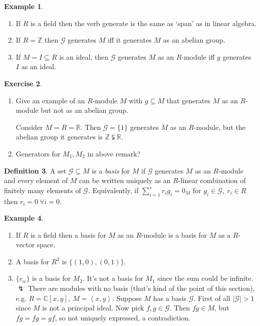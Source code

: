 \documentclass[a4paper]{article}
\newcommand{\la}{\left\langle}
\newcommand{\ra}{\right\rangle}
\newcommand{\Z}{\mathbb Z}
\newcommand{\C}{\mathbb C}
\theoremstyle{definition}
\newtheorem{defn}{Definition}[subsection]
\newtheorem{example}[defn]{Example}
\newtheorem{exe}[defn]{Exercise}
\begin{document}
\begin{example}
\begin{enumerate}
\item If $R$ is a field then the verb generate is the same as `span' as in linear algebra.
\item If $R=\Z$ then $\mathcal G$ generates $M$ iff it generates $M$ as an abelian group.
\item If $M=I\subseteq R$ is an ideal, then $\mathcal G$ generates $M$ as an $R$-module iff $g$ generates $I$ as an ideal.
\end{enumerate}
\end{example}

\begin{exe}
\begin{enumerate}
\item Give an example of an $R$-module $M$ with $g\subseteq M$ that generates $M$ as an $R$-module but not as an abelian group.

Consider $M=R=\mathbb R$. Then $\mathcal G=\{1\}$ generates $M$ as an $R$-module, but the abelian group it generates is $\Z\subsetneqq \mathbb R$.
\item Generators for $M_1,M_2$ in above remark?
\end{enumerate}
\end{exe}

\begin{defn}
A set $\mathcal G\subseteq M$ is a \textit{basis} for $M$ if $\mathcal G$ generates $M$ as an $R$-module and every element of $M$ can be written uniquely as an $R$-linear combination of finitely many elements of $\mathcal G$. Equivalently, if $\sum_{i=1}^s r_i g_i=0_M$ for $g_i\in \mathcal G,\ r_i\in R$ then $r_i=0 \ \forall i=0$.
\end{defn}

\begin{example}
\begin{enumerate}
\item If $R$ is a field then a basis for $M$ as an $R$-module is a basis for $M$ as a $R$-vector space.
\item A basis for $R^2$ is $\{(1,0),(0,1)\}$.
\item $\{e_\alpha\}$ is a basis for $M_2$. It's not a basis for $M_1$ since the sum could be infinite. $\lightning$ There are modules with no basis (that's kind of the point of this section), e.g. $R=\C[x,y],\ M=\la x,y\ra$. Suppose $M$ has a basis $\mathcal G$. First of all $|\mathcal G|>1$ since $M$ is not a principal ideal. Now pick $f,g\in \mathcal G$. Then $fg\in M$, but $fg=fg=gf$, so not uniquely expressed, a contradiction.
\end{enumerate}
\end{example}
\end{document}
